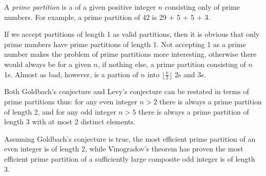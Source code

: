 \documentclass[12pt]{article}
\begin{document}
A {\em prime partition} is a  of a given positive integer $n$ consisting only of prime numbers. For example, a prime partition of 42 is 29 + 5 + 5 + 3.

If we accept partitions of length 1 as valid partitions, then it is obvious that only prime numbers have prime partitions of length 1. Not accepting 1 as a prime number makes the problem of prime partitions more interesting, otherwise there would always be for a given $n$, if nothing else, a prime partition consisting of $n$ 1s. Almost as bad, however, is a partion of $n$ into $\lfloor \frac{n}{2} \rfloor$ 2s and 3s.

Both Goldbach's conjecture and Levy's conjecture can be restated in terms of prime partitions thus: for any even integer $n > 2$ there is always a prime partition of length 2, and for any odd integer $n > 5$ there is always a prime partition of length 3 with at most 2 distinct elements.

Assuming Goldbach's conjecture is true, the most efficient prime partition of an even integer is of length 2, while Vinogradov's theorem has proven the most efficient prime partition of a sufficiently large composite odd integer is of length 3.
\end{document}
